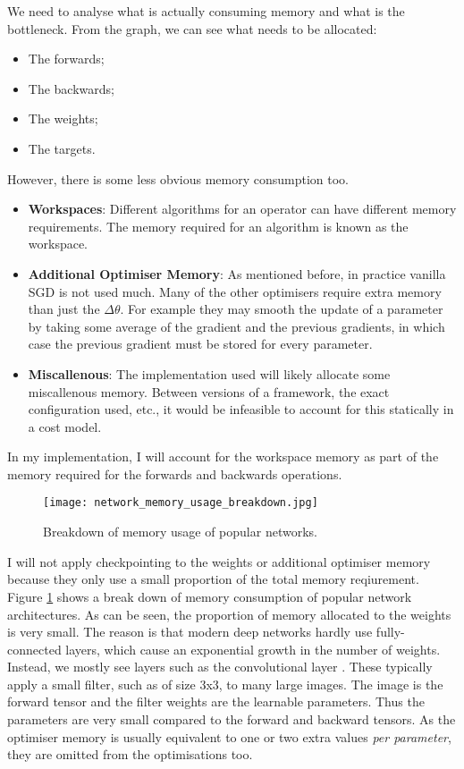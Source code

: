 We need to analyse what is actually consuming memory and what is the bottleneck. From the graph, we can see what needs to be allocated:
\begin{itemize}[topsep=0.1em]
    \item The forwards;
    \item The backwards;
    \item The weights;
    \item The targets.
\end{itemize}
However, there is some less obvious memory consumption too.
\begin{itemize}[topsep=0.1em]
    \item \textbf{Workspaces}: Different algorithms for an operator can have different memory requirements. The memory required for an algorithm is known as the workspace.
    \item \textbf{Additional Optimiser Memory}: As mentioned before, in practice vanilla SGD is not used much. Many of the other optimisers require extra memory than just the \(\Delta\theta\). For example they may smooth the update of a parameter by taking some average of the gradient and the previous gradients, in which case the previous gradient must be stored for every parameter.
    \item \textbf{Miscallenous}: The implementation used will likely allocate some miscallenous memory. Between versions of a framework, the exact configuration used, etc., it would be infeasible to account for this statically in a cost model.
\end{itemize}

In my implementation, I will account for the workspace memory as part of the memory required for the forwards and backwards operations.

\begin{figure}[htb]
    \centering
    \texttt{[image: network\_memory\_usage\_breakdown.jpg]}
    \caption{Breakdown of memory usage of popular networks. \cite[Figure~4]{Rhu2016}}
    \label{fig:2-memory-breakdown}
\end{figure}

I will not apply checkpointing to the weights or additional optimiser memory because they only use a small proportion of the total memory reqiurement.
Figure \ref{fig:2-memory-breakdown} shows a break down of memory consumption of popular network architectures.
As can be seen, the proportion of memory allocated to the weights is very small.
The reason is that modern deep networks hardly use fully-connected layers,
which cause an exponential growth in the number of weights.
Instead, we mostly see layers such as the convolutional layer .
These typically apply a small filter, such as of size 3x3, to many large images. 
The image is the forward tensor and the filter weights are the learnable parameters.
Thus the parameters are very small compared to the forward and backward tensors.
As the optimiser memory is usually equivalent to one or two extra values \textit{per parameter},
they are omitted from the optimisations too.


